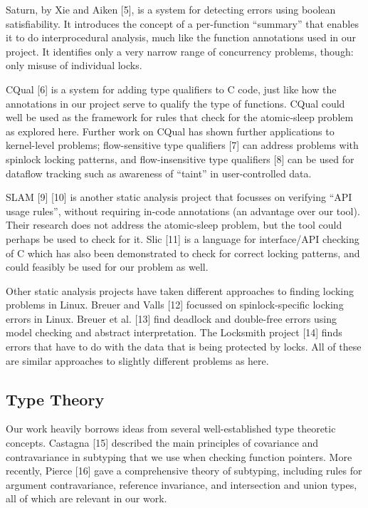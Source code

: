 \documentclass{article}
\begin{document}
Saturn, by Xie and Aiken [5], is a system for detecting errors using boolean satisfiability. It introduces the concept of a per-function ``summary'' that enables it to do interprocedural analysis, much like the function annotations used in our project. It identifies only a very narrow range of concurrency problems, though: only misuse of individual locks.

CQual [6] is a system for adding type qualifiers to C code, just like how the annotations in our project serve to qualify the type of functions. CQual could well be used as the framework for rules that check for the atomic-sleep problem as explored here. Further work on CQual has shown further applications to kernel-level problems; flow-sensitive type qualifiers [7] can address problems with spinlock locking patterns, and flow-insensitive type qualifiers [8] can be used for dataflow tracking such as awareness of ``taint'' in user-controlled data.

SLAM [9] [10] is another static analysis project that focusses on verifying ``API usage rules'', without requiring in-code annotations (an advantage over our tool). Their research does not address the atomic-sleep problem, but the tool could perhaps be used to check for it. Slic [11] is a language for interface/API checking of C which has also been demonstrated to check for correct locking patterns, and could feasibly be used for our problem as well.

Other static analysis projects have taken different approaches to finding locking problems in Linux. Breuer and Valls [12] focussed on spinlock-specific locking errors in Linux. Breuer et al. [13] find deadlock and double-free errors using model checking and abstract interpretation. The Locksmith project [14] finds errors that have to do with the data that is being protected by locks. All of these are similar approaches to slightly different problems as here.

\subsection{Type Theory}

Our work heavily borrows ideas from several well-established type theoretic concepts. Castagna [15] described the main principles of covariance and contravariance in subtyping that we use when checking function pointers. More recently, Pierce [16] gave a comprehensive theory of subtyping, including rules for argument contravariance, reference invariance, and intersection and union types, all of which are relevant in our work.
\end{document}
